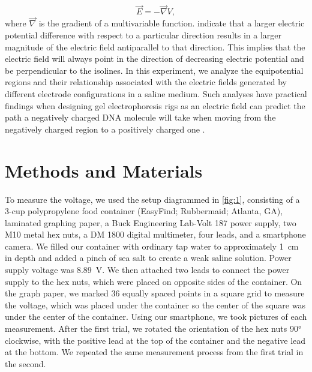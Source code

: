 \documentclass[10pt,journal,twoside]{IEEEtran}
\begin{document}
\begin{equation}
\vec{E} = -\vec{\nabla}{V},
\label{eq:2}
\end{equation}
where $\vec{\nabla}$ is the gradient of a multivariable function.  indicate that a larger electric potential difference with respect to a particular direction results in a larger magnitude of the electric field antiparallel to that direction. This implies that the electric field will always point in the direction of decreasing electric potential and be perpendicular to the isolines. In this experiment, we analyze the equipotential regions and their relationship associated with the electric fields generated by different electrode configurations in a saline medium. Such analyses have practical findings when designing gel electrophoresis rigs as an electric field can predict the path a negatively charged DNA molecule will take when moving from the negatively charged region to a positively charged one \cite{tipler,campbell}. 






\section{Methods and Materials}
To measure the voltage, we used the setup diagrammed in \cref{fig:1}, consisting of a 3-cup polypropylene food container (EasyFind; Rubbermaid; Atlanta, GA), laminated graphing paper, a Buck Engineering Lab-Volt 187 power supply, two M10 metal hex nuts, a DM 1800 digital multimeter, four leads, and a smartphone camera. We filled our container with ordinary tap water to approximately \qty{1}{\centi\meter} in depth and added a pinch of sea salt to create a weak saline solution. Power supply voltage was \qty{8.89}{\volt}. We then attached two leads to connect the power supply to the hex nuts, which were placed on opposite sides of the container. On the graph paper, we marked 36 equally spaced points in a  square grid to measure the voltage, which was placed under the container so the center of the square was under the center of the container. Using our smartphone, we took pictures of each measurement. After the first trial, we rotated the orientation of the hex nuts \ang{90} clockwise, with the positive lead at the top of the container and the negative lead at the bottom. We repeated the same measurement process from the first trial in the second.
\end{document}
